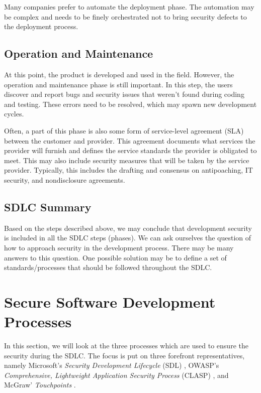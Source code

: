 \documentclass[12pt,a4,twoside]{article}
\begin{document}
Many companies prefer to automate the deployment phase. The automation may be complex and needs to be finely orchestrated not to bring security defects to the deployment process. \cite{sdlc_phoenix}

\subsection{Operation and Maintenance}

At this point, the product is developed and used in the field. However, the operation and maintenance phase is still important. In this step, the users discover and report bugs and security issues that weren't found during coding and testing. These errors need to be resolved, which may spawn new development cycles. \cite{sdlc_phoenix}

Often, a part of this phase is also some form of service-level agreement (SLA) between the customer and provider. This agreement documents what services the provider will furnish and defines the service standards the provider is obligated to meet. This may also include security measures that will be taken by the service provider. Typically, this includes the drafting and consensus on antipoaching, IT security, and nondisclosure agreements. \cite{sla}

\subsection{SDLC Summary}

Based on the steps described above, we may conclude that development security is included in all the SDLC steps (phases). We can ask ourselves the question of how to approach security in the development process. There may be many answers to this question. One possible solution may be to define a set of standards/processes that should be followed throughout the SDLC.

\section{Secure Software Development Processes}
\label{sec:ssdp}

In this section, we will look at the three processes which are used to ensure the security during the SDLC. The focus is put on three forefront representatives, namely Microsoft's \textit{Security Development Lifecycle} (SDL) \cite{microsoft_sdl}, OWASP’s \textit{Comprehensive, Lightweight Application Security Process} (CLASP) \cite{owasp}, and McGraw' \textit{Touchpoints} \cite{mcgraw2004software}.
\end{document}
